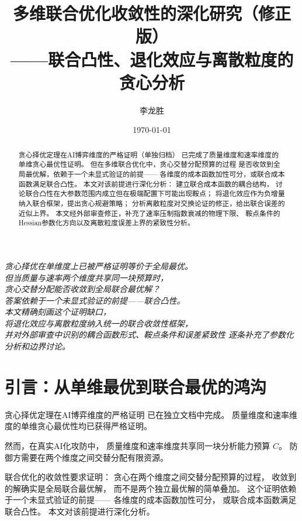 \documentclass[11pt,a4paper]{article}
\title{多维联合优化收敛性的深化研究（修正版）\\
——联合凸性、退化效应与离散粒度的贪心分析}
\author{李龙胜}
\date{\today}
\begin{document}
\maketitle

\begin{center}
\textit{
贪心择优在单维度上已被严格证明等价于全局最优。\\
但当质量与速率两个维度共享同一块预算时，\\
贪心交替分配能否收敛到全局联合最优解？\\
答案依赖于一个未显式验证的前提——联合凸性。\\
本文精确刻画这个证明缺口，\\
将退化效应与离散粒度纳入统一的联合收敛性框架，\\
并对外部审查中识别的耦合函数形式、鞍点条件和误差紧致性
逐条补充了参数化分析和边界讨论。
}
\end{center}

\vspace{5mm}

\begin{abstract}
贪心择优定理在AI博弈维度的严格证明（单独归档）
已完成了质量维度和速率维度的单维贪心最优性证明。
但在多维联合优化中，贪心交替分配预算的过程
是否收敛到全局最优解，依赖于一个未显式验证的前提——
各维度的成本函数加性可分，或联合成本函数满足联合凸性。
本文对该前提进行深化分析：
建立联合成本函数的耦合结构，
讨论联合凸性在大参数范围内成立但在极端配置下可能出现鞍点；
将退化效应作为负增量纳入联合框架，提出贪心规避策略；
分析离散粒度对交换论证的修正，给出联合误差的近似上界。
本文经外部审查修正，补充了速率压制指数衰减的物理下限、
鞍点条件的Hessian参数化方向以及离散粒度误差上界的紧致性分析。
\end{abstract}

\tableofcontents

\section{引言：从单维最优到联合最优的鸿沟}

贪心择优定理在AI博弈维度的严格证明
已在独立文档中完成。
质量维度和速率维度的单维贪心最优性均已获得严格证明。

然而，在真实AI化攻防中，
质量维度和速率维度共享同一块分析能力预算 \(C\)。
防御方需要在两个维度之间交替分配有限资源。

联合优化的收敛性要求证明：
贪心在两个维度之间交替分配预算的过程，
收敛到的解确实是全局联合最优解，
而不是两个独立最优解的简单叠加。
这个证明依赖于一个未显式验证的前提——
各维度的成本函数加性可分，
或联合成本函数满足联合凸性。
本文对该前提进行深化分析。
\end{document}
